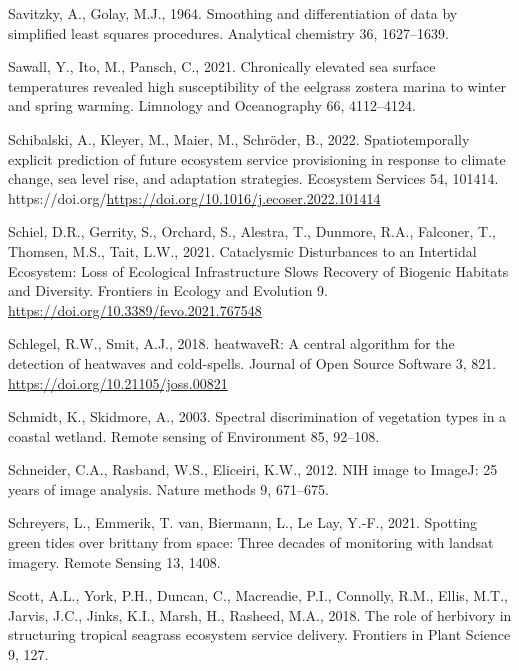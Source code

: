 \documentclass[
  letterpaper,
  11pt,
  english,
  singlespacing,
  headsepline]{MastersDoctoralThesis}
\newlength{\cslhangindent}
\newenvironment{CSLReferences}[2] %
 {\begin{list}{}{%
  \setlength{\itemindent}{0pt}
  \setlength{\leftmargin}{0pt}
  \setlength{\parsep}{0pt}
  \ifodd #1
   \setlength{\leftmargin}{\cslhangindent}
   \setlength{\itemindent}{-1\cslhangindent}
  \fi
  \setlength{\itemsep}{#2\baselineskip}}}
 {\end{list}}
\begin{document}
\begin{CSLReferences}{1}{0}
Savitzky, A., Golay, M.J., 1964. Smoothing and differentiation of data
by simplified least squares procedures. Analytical chemistry 36,
1627--1639.

Sawall, Y., Ito, M., Pansch, C., 2021. Chronically elevated sea surface
temperatures revealed high susceptibility of the eelgrass zostera marina
to winter and spring warming. Limnology and Oceanography 66, 4112--4124.

Schibalski, A., Kleyer, M., Maier, M., Schröder, B., 2022.
Spatiotemporally explicit prediction of future ecosystem service
provisioning in response to climate change, sea level rise, and
adaptation strategies. Ecosystem Services 54, 101414.
https://doi.org/\url{https://doi.org/10.1016/j.ecoser.2022.101414}

Schiel, D.R., Gerrity, S., Orchard, S., Alestra, T., Dunmore, R.A.,
Falconer, T., Thomsen, M.S., Tait, L.W., 2021. {Cataclysmic Disturbances
to an Intertidal Ecosystem: Loss of Ecological Infrastructure Slows
Recovery of Biogenic Habitats and Diversity}. Frontiers in Ecology and
Evolution 9. \url{https://doi.org/10.3389/fevo.2021.767548}

Schlegel, R.W., Smit, A.J., 2018. {heatwaveR}: A central algorithm for
the detection of heatwaves and cold-spells. Journal of Open Source
Software 3, 821. \url{https://doi.org/10.21105/joss.00821}

Schmidt, K., Skidmore, A., 2003. Spectral discrimination of vegetation
types in a coastal wetland. Remote sensing of Environment 85, 92--108.

Schneider, C.A., Rasband, W.S., Eliceiri, K.W., 2012. NIH image to
ImageJ: 25 years of image analysis. Nature methods 9, 671--675.

Schreyers, L., Emmerik, T. van, Biermann, L., Le Lay, Y.-F., 2021.
Spotting green tides over brittany from space: Three decades of
monitoring with landsat imagery. Remote Sensing 13, 1408.

Scott, A.L., York, P.H., Duncan, C., Macreadie, P.I., Connolly, R.M.,
Ellis, M.T., Jarvis, J.C., Jinks, K.I., Marsh, H., Rasheed, M.A., 2018.
The role of herbivory in structuring tropical seagrass ecosystem service
delivery. Frontiers in Plant Science 9, 127.


\end{CSLReferences}
\end{document}
